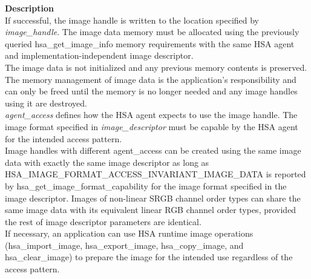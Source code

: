 \documentclass{book}
\newcommand{\hsaarg}[1]{\textit{#1}}
\newcommand{\hsatyp}[2]{\hypertarget{#1}{#2}}
\begin{document}
\begin{appendices}
\begin{longtable}{@{}>{\hangindent=2em}p{\linewidth}}
\end{longtable}
\vspace{-4mm}\noindent\textbf{Description}\\[1mm]
If successful, the image handle is written to the location specified by \hsaarg{image\_handle}. The image data memory must be allocated using the previously queried \hsatyp{group__images_1ga8c64f020e8ab3009b9933a752b288172}{hsa\_get\_image\_info} memory requirements with the same HSA agent and implementation-independent image descriptor.\\[2mm]
The image data is not initialized and any previous memory contents is preserved. The memory management of image data is the application's responsibility and can only be freed until the memory is no longer needed and any image handles using it are destroyed.\\[2mm]
\hsaarg{agent\_access} defines how the HSA agent expects to use the image handle. The image format specified in \hsaarg{image\_descriptor} must be capable by the HSA agent for the intended access pattern.\\[2mm]
Image handles with different agent\_access can be created using the same image data with exactly the same image descriptor as long as \hsatyp{group__images_1ggab8be837beba5ecf84b757d5a5c1b80d5a8a70c7d8e7727e621217a246d38e4f0b}{HSA\_IMAGE\_FORMAT\_ACCESS\_INVARIANT\_IMAGE\_DATA} is reported by \hsatyp{group__images_1gac3bee17f99b73d928d03d056dce59cd8}{hsa\_get\_image\_format\_capability} for the image format specified in the image descriptor. Images of non-linear SRGB channel order types can share the same image data with its equivalent linear RGB channel order types, provided the rest of image descriptor parameters are identical.\\[2mm]
If necessary, an application can use HSA runtime image operations (\hsatyp{group__images_1ga570f75d237fdc708262857882682cffc}{hsa\_import\_image}, \hsatyp{group__images_1ga22101bdb49515da4a641c5eeb36dc5d7}{hsa\_export\_image}, \hsatyp{group__images_1gad15622362c86b44647fd80479f0e6214}{hsa\_copy\_image}, and \hsatyp{group__images_1ga3991da776704eb3eea90c36206a45f2f}{hsa\_clear\_image}) to prepare the image for the intended use regardless of the access pattern. 



\end{appendices}
\end{document}
